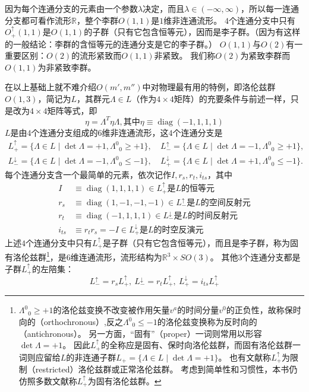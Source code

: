 因为每个连通分支的元素由一个参数$\lambda$决定，而且$\lambda \in (-\infty, \infty)$，所以每一连通分支都可看作流形$\mathbb{R}$，整个李群$O(1, 1)$是$1$维非连通流形。
$4$个连通分支中只有$O^\uparrow_+(1, 1)$是$O(1, 1)$的子群（只有它包含恒等元），因而是李子群。（因为有这样的一般结论：李群的含恒等元的连通分支是它的李子群。）
$O(1, 1)$与$O(2)$有一重要区别：$O(2)$的流形紧致而$O(1, 1)$非紧致。
我们称$O(2)$为紧致李群而$O(1, 1)$为非紧致李群。

在以上基础上就不难介绍$O(m', m'')$中对物理最有用的特例，即洛伦兹群$O(1, 3)$，简记为$L$，其群元$\Lambda \in L$（作为$4 \times 4$矩阵）的充要条件与前述一样，只是改为$4 \times 4$矩阵等式，即
$$\eta = \Lambda^T\eta\Lambda, \text{其中} \eta \equiv \operatorname{diag}(-1, 1, 1, 1)$$
$L$是由$4$个连通分支组成的$6$维非连通流形，这$4$个连通分支是
\[\begin{split}
    L^\uparrow_+ = \{\Lambda \in L \mid \det \Lambda = +1, \Lambda^0{}_0 \geq +1\}, ~ & L^\uparrow_- = \{\Lambda \in L \mid \det \Lambda = -1, \Lambda^0{}_0 \geq +1\}, \\
    L^\downarrow_- = \{\Lambda \in L \mid \det \Lambda = -1, \Lambda^0{}_0 \leq -1\}, ~ & L^\downarrow_+ = \{\Lambda \in L \mid \det \Lambda = +1, \Lambda^0{}_0 \leq -1\}.
\end{split}\]
每个连通分支含一个最简单的元素，依次记作$I, r_s, r_t, i_{ts}$，其中
\[\begin{aligned}
    I  & \equiv \operatorname{diag}(1, 1, 1, 1) \in L^\uparrow_+ \text{是$L$的恒等元} \\
    r_s & \equiv \operatorname{diag}(1, -1, -1, -1) \in L^\uparrow_- \text{是$L$的空间反射元} \\
    r_t & \equiv \operatorname{diag}(-1, 1, 1, 1) \in L^\downarrow_- \text{是$L$的时间反射元} \\
    i_{ts} & \equiv r_tr_s = -I \in L^\downarrow_+ \text{是$L$的时空反演元}
\end{aligned}\]
上述$4$个连通分支中只有$L^\uparrow_+$是子群（只有它包含恒等元），而且是李子群，称为固有洛伦兹群\footnote{
    $\Lambda^0{}_0 \geq +1$的洛伦兹变换不改变被作用矢量$v^a$的时间分量$v^0$的正负性，故称保时向的（orthochronous）,反之$\Lambda^0{}_0 \leq -1$的洛伦兹变换称为反时向的（antichronous）。
    另一方面，``固有''（proper）一词则常用以形容$\det \Lambda = +1$。
    因此$L^\uparrow_+$的全称应是固有、保时向洛伦兹群，而固有洛伦兹群一词则应留给$L$的非连通子群$L_+ = \{\Lambda \in L \mid \det \Lambda = +1\}$。
    也有文献称$L^\uparrow_+$为限制（restricted）洛伦兹群或正常洛伦兹群。
    考虑到简单性和习惯性，本书仍仿照多数文献称$L^\uparrow_+$为固有洛伦兹群。
}，是$6$维连通流形，流形结构为$\mathbb{R}^3 \times SO(3)$。
其他$3$个连通分支都是子群$L^\uparrow_+$的左陪集：
$$L^\uparrow_- = r_sL^\uparrow_+, ~ L^\downarrow_- = r_tL^\uparrow_+, ~ L^\downarrow_+ = i_{ts}L^\uparrow_+$$

